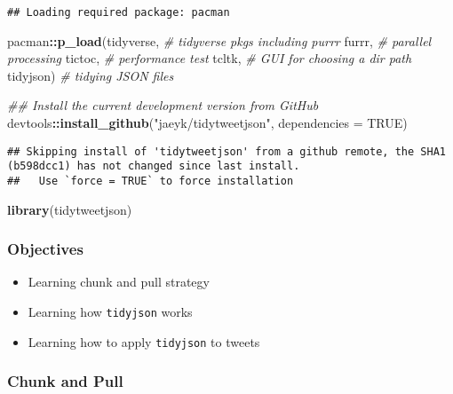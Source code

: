 \documentclass[
]{book}
\newenvironment{Shaded}{\begin{snugshade}}{\end{snugshade}}
\newcommand{\CommentTok}[1]{\textcolor[rgb]{0.56,0.35,0.01}{\textit{#1}}}
\newcommand{\DataTypeTok}[1]{\textcolor[rgb]{0.13,0.29,0.53}{#1}}
\newcommand{\KeywordTok}[1]{\textcolor[rgb]{0.13,0.29,0.53}{\textbf{#1}}}
\newcommand{\NormalTok}[1]{#1}
\newcommand{\OperatorTok}[1]{\textcolor[rgb]{0.81,0.36,0.00}{\textbf{#1}}}
\newcommand{\OtherTok}[1]{\textcolor[rgb]{0.56,0.35,0.01}{#1}}
\newcommand{\StringTok}[1]{\textcolor[rgb]{0.31,0.60,0.02}{#1}}
\providecommand{\tightlist}{%
  \setlength{\itemsep}{0pt}\setlength{\parskip}{0pt}}
\begin{document}
\begin{verbatim}
## Loading required package: pacman
\end{verbatim}

\begin{Shaded}
\begin{Highlighting}[]
\NormalTok{pacman}\OperatorTok{::}\KeywordTok{p\_load}\NormalTok{(tidyverse, }\CommentTok{\# tidyverse pkgs including purrr}
\NormalTok{               furrr, }\CommentTok{\# parallel processing }
\NormalTok{               tictoc, }\CommentTok{\# performance test  }
\NormalTok{               tcltk, }\CommentTok{\# GUI for choosing a dir path }
\NormalTok{               tidyjson) }\CommentTok{\# tidying JSON files }

\CommentTok{\#\# Install the current development version from GitHub}
\NormalTok{devtools}\OperatorTok{::}\KeywordTok{install\_github}\NormalTok{(}\StringTok{"jaeyk/tidytweetjson"}\NormalTok{,}
                         \DataTypeTok{dependencies =} \OtherTok{TRUE}\NormalTok{)}
\end{Highlighting}
\end{Shaded}

\begin{verbatim}
## Skipping install of 'tidytweetjson' from a github remote, the SHA1 (b598dcc1) has not changed since last install.
##   Use `force = TRUE` to force installation
\end{verbatim}

\begin{Shaded}
\begin{Highlighting}[]
\KeywordTok{library}\NormalTok{(tidytweetjson)}
\end{Highlighting}
\end{Shaded}

\hypertarget{objectives-6}{%
\subsubsection{Objectives}\label{objectives-6}}

\begin{itemize}
\tightlist
\item
  Learning chunk and pull strategy
\item
  Learning how \texttt{tidyjson} works
\item
  Learning how to apply \texttt{tidyjson} to tweets
\end{itemize}

\hypertarget{chunk-and-pull}{%
\subsubsection{Chunk and Pull}\label{chunk-and-pull}}
\end{document}
